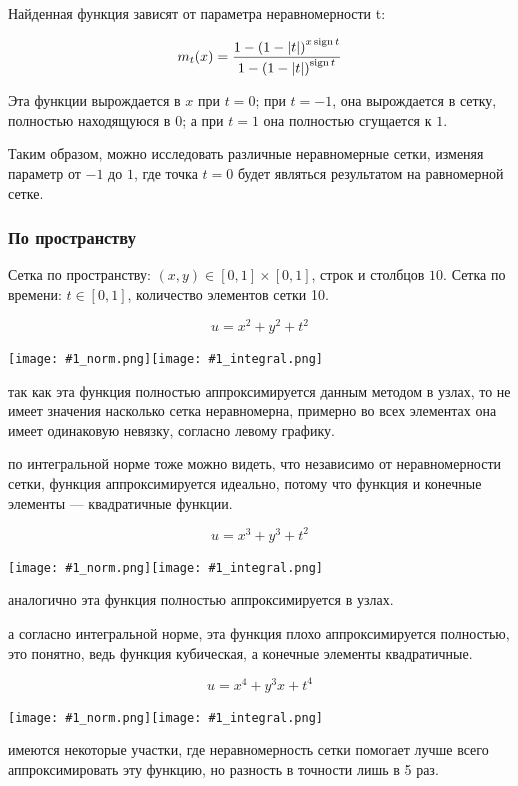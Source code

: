 Найденная функция зависят от параметра неравномерности t:

$$ m_t(x) = \frac{1-\left(1-|t|\right)^{x\operatorname{sign} t}}{1-\left(1-|t|\right)^{\operatorname{sign} t}} $$

Эта функции вырождается в $x$ при $t=0$; при $t=-1$, она вырождается в сетку, полностью находящуюся в $0$; а при $t=1$ она полностью сгущается к $1$. 

Таким образом, можно исследовать различные неравномерные сетки, изменяя параметр от $-1$ до $1$, где точка $t=0$ будет являться результатом на равномерной сетке.

\subsubsection{По пространству}

Сетка по пространству: $ (x, y) \in [0, 1] \times [0, 1] $, строк и столбцов $10$. Сетка по времени: $ t \in [0, 1] $, количество элементов сетки 10.

\newcommand{\includetwoimages}[1]{
\noindent\texttt{[image: \#1\_norm.png]}\texttt{[image: \#1\_integral.png]}
}

$$ u = x^2 + y^2 + t^2 $$

\includetwoimages{space_tgrid_0}

\conclusion так как эта функция полностью аппроксимируется данным методом в узлах, то не имеет значения насколько сетка неравномерна, примерно во всех элементах она имеет одинаковую невязку, согласно левому графику.

\conclusion по интегральной норме тоже можно видеть, что независимо от неравномерности сетки, функция аппроксимируется идеально, потому что функция и конечные элементы --- квадратичные функции.

$$ u = x^3 + y^3 + t^2 $$

\includetwoimages{space_tgrid_5}

\conclusion аналогично эта функция полностью аппроксимируется в узлах.

\conclusion а согласно интегральной норме, эта функция плохо аппроксимируется полностью, это понятно, ведь функция кубическая, а конечные элементы квадратичные.

$$ u = x^4 + y^3x + t^4 $$

\includetwoimages{space_tgrid_1}

\conclusion имеются некоторые участки, где неравномерность сетки помогает лучше всего аппроксимировать эту функцию, но разность в точности лишь в 5 раз.


